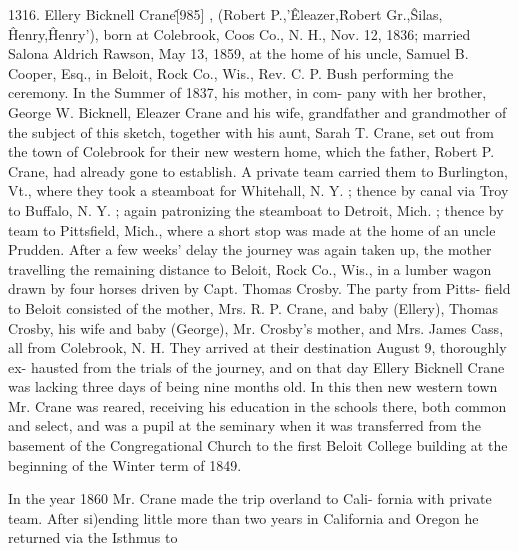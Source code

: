 1316. Ellery Bicknell Crane\^ [985] , (Robert P.,'\^ Eleazer,\^ 
Robert Gr.,\^ Silas, \^ Henry,\^ Henry'), born at Colebrook, Coos 
Co., N. H., Nov. 12, 1836; married Salona Aldrich Rawson, 
May 13, 1859, at the home of his uncle, Samuel B. Cooper, 
Esq., in Beloit, Rock Co., Wis., Rev. C. P. Bush performing 
the ceremony. In the Summer of 1837, his mother, in com- 
pany with her brother, George W. Bicknell, Eleazer Crane and 
his wife, grandfather and grandmother of the subject of this 
sketch, together with his aunt, Sarah T. Crane, set out from the 
town of Colebrook for their new western home, which the father, 
Robert P. Crane, had already gone to establish. A private team 
carried them to Burlington, Vt., where they took a steamboat for 
Whitehall, N. Y. ; thence by canal via Troy to Buffalo, N. Y. ; 
again patronizing the steamboat to Detroit, Mich. ; thence by 
team to Pittsfield, Mich., where a short stop was made at the 
home of an uncle Prudden. After a few weeks' delay the journey 
was again taken up, the mother travelling the remaining distance 
to Beloit, Rock Co., Wis., in a lumber wagon drawn by four 
horses driven by Capt. Thomas Crosby. The party from Pitts- 
field to Beloit consisted of the mother, Mrs. R. P. Crane, and 
baby (Ellery), Thomas Crosby, his wife and baby (George), Mr. 
Crosby's mother, and Mrs. James Cass, all from Colebrook, N. 
H. They arrived at their destination August 9, thoroughly ex- 
hausted from the trials of the journey, and on that day Ellery 
Bicknell Crane was lacking three days of being nine months old. 
In this then new western town Mr. Crane was reared, receiving 
his education in the schools there, both common and select, and 
was a pupil at the seminary when it was transferred from the 
basement of the Congregational Church to the first Beloit College 
building at the beginning of the Winter term of 1849. 

In the year 1860 Mr. Crane made the trip overland to Cali- 
fornia with private team. After si)ending little more than two 
years in California and Oregon he returned via the Isthmus to 




